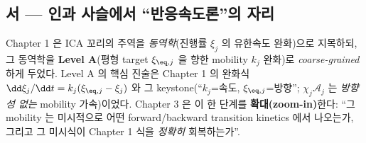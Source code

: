 \subsection*{서 — 인과 사슬에서 ``반응속도론''의 자리}
Chapter 1 은 ICA 꼬리의 주역을 \emph{동역학}(진행률 $\xi_j$ 의 유한속도 완화)으로 지목하되, 그 동역학을
\textbf{Level A}(평형 target $\xi_{\eq,j}$ 을 향한 mobility $k_j$ 완화)로 \emph{coarse-grained} 하게 두었다.
Level A 의 핵심 진술은 Chapter 1 의 완화식 $\dd\xi_j/\dd t=k_j(\xi_{\eq,j}-\xi_j)$ 와 그 keystone(``$k_j$=속도,
$\xi_{\eq,j}$=방향''; $\chi_j\mathcal A_j$ 는 \emph{방향성 없는} mobility 가속)이었다. Chapter 3 은 이 한 단계를
\textbf{확대(zoom-in)}한다: ``그 mobility 는 미시적으로 어떤 forward/backward transition kinetics 에서
나오는가, 그리고 그 미시식이 Chapter 1 식을 \emph{정확히} 회복하는가''.

